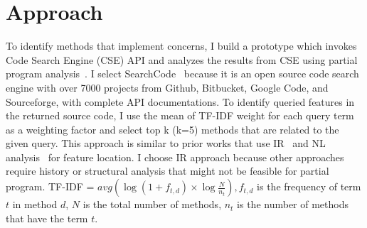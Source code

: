 

\section{Approach}

To identify methods that implement concerns, I build a prototype which invokes Code Search Engine (CSE) API and analyzes the results from CSE using partial program analysis~\cite{partialProgram:OOPSLA08}. I select SearchCode~\cite{SearchCode} because it is an open source code search engine with over 7000 projects from  Github, Bitbucket, Google Code, and Sourceforge, with complete API documentations. To identify queried features in the returned source code,  I use the mean of TF-IDF weight  for each query term as a weighting factor and select top k (k=5) methods that are related to the given query.  This approach is similar to prior works that use  IR~\cite{Denys:FCA12} and NL analysis~\cite{Hill:FindConcept07} for feature location. I choose IR approach because other approaches require history or structural analysis that might not be feasible for partial program. TF-IDF =  $avg( \log (1 + f_{t,d}) \times  \log \frac {N} {n_t}), f_{t,d}$ is the frequency of term $t$ in method $d$, $N$ is the total number of methods, $n_t$ is the number of methods that have the term $t$.
